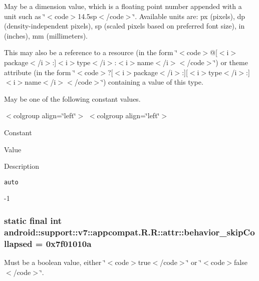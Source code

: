 May be a dimension value, which is a floating point number appended with a unit such as \char`\"{}$<$code$>$14.5sp$<$/code$>$\char`\"{}. Available units are: px (pixels), dp (density-independent pixels), sp (scaled pixels based on preferred font size), in (inches), mm (millimeters). 

This may also be a reference to a resource (in the form \char`\"{}$<$code$>$@\mbox{[}$<$i$>$package$<$/i$>$:\mbox{]}$<$i$>$type$<$/i$>$:$<$i$>$name$<$/i$>$$<$/code$>$\char`\"{}) or theme attribute (in the form \char`\"{}$<$code$>$?\mbox{[}$<$i$>$package$<$/i$>$:\mbox{]}\mbox{[}$<$i$>$type$<$/i$>$:\mbox{]}$<$i$>$name$<$/i$>$$<$/code$>$\char`\"{}) containing a value of this type. 

May be one of the following constant values. \begin{TabularC}{0}
\hline
\end{TabularC}
$<$colgroup align=\char`\"{}left\char`\"{}$>$ $<$colgroup align=\char`\"{}left\char`\"{}$>$ 

Constant

Value

Description 

{\tt auto}

-1\hypertarget{classandroid_1_1support_1_1v7_1_1appcompat_1_1_r_1_1attr_43429ccab8469646d85da0bc38751460}{
\subsubsection[{behavior\_\-skipCollapsed}]{\setlength{\rightskip}{0pt plus 5cm}static final int android::support::v7::appcompat.R.R::attr::behavior\_\-skipCollapsed = 0x7f01010a}}
\label{classandroid_1_1support_1_1v7_1_1appcompat_1_1_r_1_1attr_43429ccab8469646d85da0bc38751460}


Must be a boolean value, either \char`\"{}$<$code$>$true$<$/code$>$\char`\"{} or \char`\"{}$<$code$>$false$<$/code$>$\char`\"{}. 

